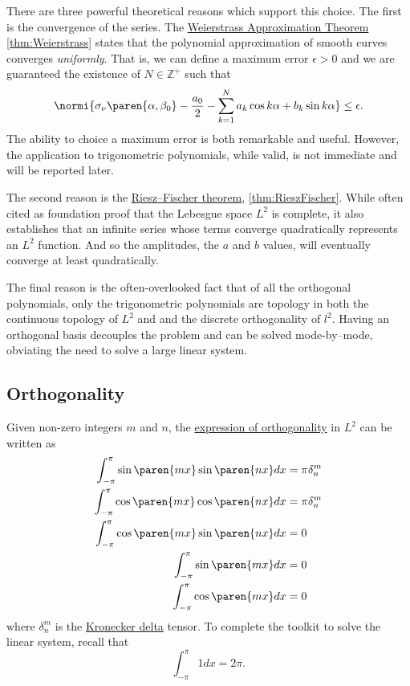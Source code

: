 There are three powerful theoretical reasons which support this choice. The first is the convergence of the series. The \href{Weierstrass Approximation Theorem}{Weierstrass Approximation Theorem} \eqref{thm:Weierstrass} states that the polynomial approximation of smooth curves converges {\it{uniformly}}. That is, we can define a maximum error $\epsilon > 0$ and we are guaranteed the existence of $N \in \mathbb{Z}^{+}$ such that
\begin{equation}
	\normi{\sigma_{\nu}\paren{\alpha, \beta_{0}} -  \dfrac{a_{0}}{2} - \sum_{k=1}^{N}a_{k}\cos k\alpha + b_{k}\sin k\alpha} \le \epsilon.
\end{equation}
The ability to choice a maximum error is both remarkable and useful. However, the application to trigonometric polynomials, while valid, is not immediate and will be reported later.

The second reason is the \href{https://en.wikipedia.org/wiki/Riesz–Fischer_theorem}{Riesz–Fischer theorem}, \eqref{thm:RieszFischer}. While often cited as foundation proof that the Lebesgue space $L^{2}$ is complete, it also establishes that an infinite series whose terms converge quadratically represents an $L^{2}$ function. And so the amplitudes, the $a$ and $b$ values, will eventually converge at least quadratically.

The final reason is the often-overlooked fact that of all the orthogonal polynomials, only the trigonometric polynomials are topology in both the continuous topology of $L^{2}$ and and the discrete orthogonality of $l^{2}$. Having an orthogonal basis decouples the problem and can be solved mode-by--mode, obviating the need to solve a large linear system.

\subsection{Orthogonality}
Given non-zero integers $m$ and $n$, the \href{https://mathworld.wolfram.com/FourierSeries.html}{expression of orthogonality} in $L^{2}$ can be written as
\begin{equation}
	\begin{split}
		\int_{-\pi}^{\pi} \sin \paren{mx} \sin \paren{nx}dx &= \pi \delta^{m}_{n}\\
		\int_{-\pi}^{\pi} \cos \paren{mx} \cos \paren{nx} dx &= \pi \delta^{m}_{n}\\
		\int_{-\pi}^{\pi} \cos \paren{mx} \sin \paren{nx} dx &= 0\\
		\int_{-\pi}^{\pi} \sin \paren{mx} dx &= 0\\
		\int_{-\pi}^{\pi} \cos \paren{mx}dx &= 0\\
	\end{split}
\label{eq:orthogonality}
\end{equation}
%
where $\delta^{m}_{n}$ is the \href{https://mathworld.wolfram.com/KroneckerDelta.html}{Kronecker delta} tensor. To complete the toolkit to solve the linear system, recall that
\begin{equation}
	\int_{-\pi}^{\pi} 1 dx = 2\pi.
\end{equation}

